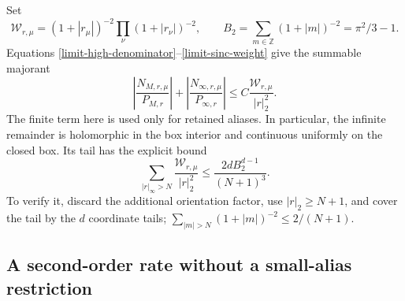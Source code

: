 Set
\[
 \mathcal W_{r,\mu}=(1+|r_\mu|)^{-2}
                         \prod_\nu(1+|r_\nu|)^{-2},
 \qquad
 B_2=\sum_{m\in\mathbb Z}(1+|m|)^{-2}=\pi^2/3-1.
\]
Equations \eqref{limit-high-denominator}--\eqref{limit-sinc-weight}
give the summable majorant
\begin{equation}\label{limit-majorant}
 \left|\frac{N_{M,r,\mu}}{P_{M,r}}\right|
 +\left|\frac{N_{\infty,r,\mu}}{P_{\infty,r}}\right|
 \le C\frac{\mathcal W_{r,\mu}}{|r|_2^2}.
\end{equation}
The finite term here is used only for retained aliases. In particular,
the infinite remainder is holomorphic in the box interior and
continuous uniformly on the closed box. Its tail has the explicit bound
\begin{equation}\label{limit-tail}
 \sum_{|r|_\infty>N}\frac{\mathcal W_{r,\mu}}{|r|_2^2}
 \le\frac{2d B_2^{d-1}}{(N+1)^3}.
\end{equation}
To verify it, discard the additional orientation factor, use
$|r|_2\ge N+1$, and cover the tail by the $d$ coordinate tails;
$\sum_{|m|>N}(1+|m|)^{-2}\le2/(N+1)$.

\subsection{A second-order rate without a small-alias restriction}

